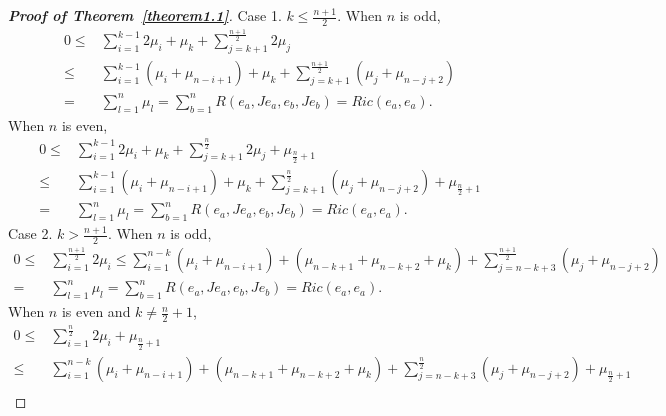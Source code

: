 \documentclass{amsart}
\theoremstyle{definition}
\theoremstyle{remark}
\numberwithin{equation}{section}
\begin{document}
\begin{proof}[{\bf Proof of Theorem~\ref{theorem1.1}}]
Case 1. $k\le \frac{n+1}{2}$.  When $n$ is odd,
\begin{align*}
  0 \le & \sum\limits_{i = 1}^{k - 1} {2\mu _i}  + {\mu _k} + \sum\limits_{j = k + 1}^{\frac{{n + 1}}{2}} {2{\mu _j}} \\
   \le & \sum\limits_{i = 1}^{k - 1} {\left( {{\mu _i} + {\mu _{n - i + 1}}} \right)}  + {\mu _k} + \sum\limits_{j = k + 1}^{\frac{{n + 1}}{2}} {\left( {{\mu _j} + {\mu _{n - j + 2}}} \right)} \\
   =& \sum\limits_{l = 1}^n {{\mu _l}}  = \sum\limits_{b = 1}^n {R\left( {{e_a},J{e_a},{e_b},J{e_b}} \right)}
   =Ric\left( {{e_a},{e_a}} \right).
\end{align*}
When $n$ is even,
\begin{align*}
  0 \le & \sum\limits_{i = 1}^{k - 1} {2\mu _i}  + {\mu _k} + \sum\limits_{j = k + 1}^{\frac{n}{2}} {2{\mu _j}}  + {\mu _{\frac{n}{2} + 1}}  \\
   \le & \sum\limits_{i = 1}^{k - 1} {\left( {{\mu _i} + {\mu _{n - i + 1}}} \right)}  + {\mu _k} + \sum\limits_{j = k + 1}^{\frac{n}{2}} {\left( {{\mu _j} + {\mu _{n - j + 2}}} \right)}  + {\mu _{\frac{n}{2} + 1}} \\
   =& \sum\limits_{l = 1}^n {{\mu _l}}  = \sum\limits_{b = 1}^n {R\left( {{e_a},J{e_a},{e_b},J{e_b}} \right)}
   = Ric\left( {{e_a},{e_a}} \right) .
\end{align*}
Case 2.  $k > \frac{n+1}{2}$. When $n$ is odd,
\begin{align*}
0 \le & \sum\limits_{i = 1}^{\frac{{n + 1}}{2}} {2{\mu _i}}
 \le  \sum\limits_{i = 1}^{n - k} {\left( {{\mu _i} + {\mu _{n - i + 1}}} \right)}  + \left( {{\mu _{n - k + 1}} + {\mu _{n - k + 2}} + {\mu _k}} \right) + \sum\limits_{j = n - k + 3}^{\frac{{n + 1}}{2}} {\left( {{\mu _j} + {\mu _{n - j + 2}}} \right)} \\
 = & \sum\limits_{l = 1}^n {{\mu _l}}  = \sum\limits_{b = 1}^n {R\left( {{e_a},J{e_a},{e_b},J{e_b}} \right)}
 =  Ric\left( {{e_a},{e_a}} \right).
\end{align*}
When $n$ is even and $k \ne \frac{n}{2}+1$,
\begin{align*}
0 \le & \sum\limits_{i = 1}^{\frac{n}{2}} {2{\mu _i}}  + {\mu _{\frac{n}{2} + 1}}\\
 \le & \sum\limits_{i = 1}^{n - k} {\left( {{\mu _i} + {\mu _{n - i + 1}}} \right)}  + \left( {{\mu _{n - k + 1}} + {\mu _{n - k + 2}} + {\mu _k}} \right) + \sum\limits_{j = n - k + 3}^{\frac{n}{2}} {\left( {{\mu _j} + {\mu _{n - j + 2}}} \right)}  + {\mu _{\frac{n}{2} + 1}}\\

\end{align*}
\end{proof}
\end{document}
